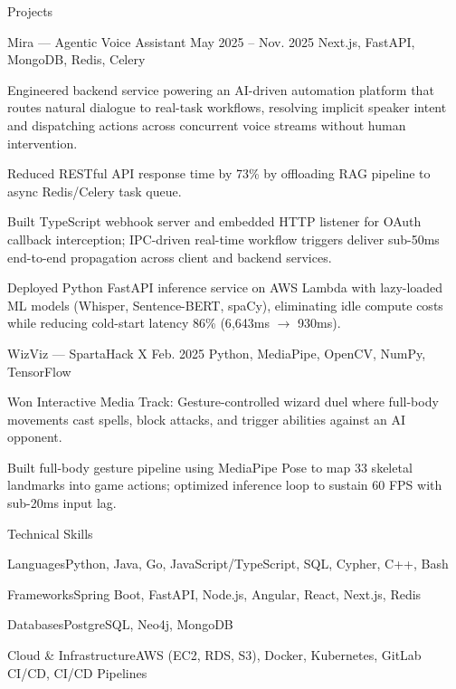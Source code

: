 \documentclass[
	11pt
]{../../../resume}
\begin{document}
	\begin{rSection}{P}{rojects}
		\begin{rSectionEntry}
			{Mira --- Agentic Voice Assistant}
			{May 2025 -- Nov. 2025}
			{}
			{Next.js, FastAPI, MongoDB, Redis, Celery}
			{}

			\item Engineered backend service powering an AI-driven automation platform that routes natural dialogue to real-task workflows, resolving implicit speaker intent and dispatching actions across concurrent voice streams without human intervention.
			\item Reduced RESTful API response time by 73\% by offloading RAG pipeline to async Redis/Celery task queue.
			\item Built TypeScript webhook server and embedded HTTP listener for OAuth callback interception; IPC-driven real-time workflow triggers deliver sub-50ms end-to-end propagation across client and backend services.
			\item Deployed Python FastAPI inference service on AWS Lambda with lazy-loaded ML models (Whisper, Sentence-BERT, spaCy), eliminating idle compute costs while reducing cold-start latency 86\% (6{,}643ms $\rightarrow$ 930ms).
		\end{rSectionEntry}

		\begin{rSectionEntry}
			{WizViz --- SpartaHack X}
			{Feb. 2025}
			{}
			{Python, MediaPipe, OpenCV, NumPy, TensorFlow}
			{}

			\item Won Interactive Media Track: Gesture-controlled wizard duel where full-body movements cast spells, block attacks, and trigger abilities against an AI opponent.
			\item Built full-body gesture pipeline using MediaPipe Pose to map 33 skeletal landmarks into game actions; optimized inference loop to sustain 60 FPS with sub-20ms input lag.
		\end{rSectionEntry}
	\end{rSection}

	\begin{rSection}{T}{echnical Skills}
		\begin{rSet}{Languages}{Python, Java, Go, JavaScript/TypeScript, SQL, Cypher, C++, Bash}
		\end{rSet}
		\begin{rSet}{Frameworks}{Spring Boot, FastAPI, Node.js, Angular, React, Next.js, Redis}
		\end{rSet}
		\begin{rSet}{Databases}{PostgreSQL, Neo4j, MongoDB}
		\end{rSet}
		\begin{rSet}{Cloud \& Infrastructure}{AWS (EC2, RDS, S3), Docker, Kubernetes, GitLab CI/CD, CI/CD Pipelines}
		\end{rSet}
	\end{rSection}
\end{document}

